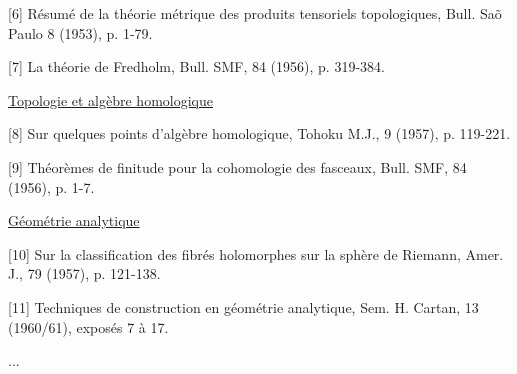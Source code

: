 [6] Résumé de la théorie métrique des produits tensoriels
topologiques, Bull. Sa\~o Paulo 8 (1953), p. 1-79.

[7] La théorie de Fredholm, Bull. SMF, 84 (1956), p. 319-384.

\uline{Topologie et algèbre homologique}

[8] Sur quelques points d'algèbre homologique, Tohoku M.J.,
9 (1957), p. 119-221.

[9] Théorèmes de finitude pour la cohomologie des fasceaux,
Bull. SMF, 84 (1956), p. 1-7.

\uline{Géométrie analytique}

[10] Sur la classification des fibrés holomorphes sur la
sphère de Riemann, Amer. J., 79 (1957), p. 121-138.

[11] Techniques de construction en géométrie analytique,
Sem. H. Cartan, 13 (1960/61), exposés 7 à 17.

...

